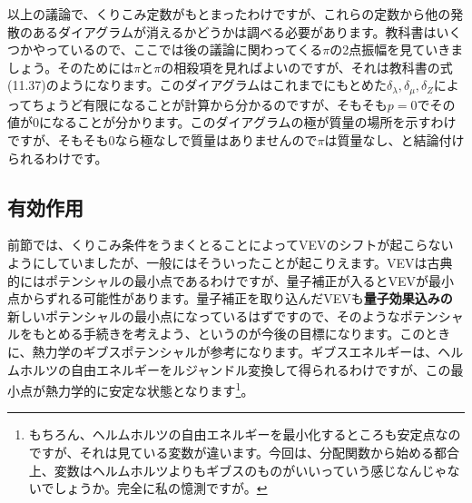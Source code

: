 \documentclass[unicode,a4paper,11pt]{ltjsarticle}
\theoremstyle{definition}
\begin{document}
以上の議論で、くりこみ定数がもとまったわけですが、これらの定数から他の発散のあるダイアグラムが消えるかどうかは調べる必要があります。教科書はいくつかやっているので、ここでは後の議論に関わってくる$\pi$の2点振幅を見ていきましょう。そのためには$\pi$と$\pi$の相殺項を見ればよいのですが、それは教科書の式(11.37)のようになります。このダイアグラムはこれまでにもとめた$\delta_{\lambda},\delta_{\mu},\delta_{Z}$によってちょうど有限になることが計算から分かるのですが、そもそも$p=0$でその値が0になることが分かります。このダイアグラムの極が質量の場所を示すわけですが、そもそも0なら極なしで質量はありませんので$\pi$は質量なし、と結論付けられるわけです。


\subsection{有効作用}

前節では、くりこみ条件をうまくとることによってVEVのシフトが起こらないようにしていましたが、一般にはそういったことが起こりえます。VEVは古典的にはポテンシャルの最小点であるわけですが、量子補正が入るとVEVが最小点からずれる可能性があります。量子補正を取り込んだVEVも\textbf{量子効果込みの}新しいポテンシャルの最小点になっているはずですので、そのようなポテンシャルをもとめる手続きを考えよう、というのが今後の目標になります。このときに、熱力学のギブスポテンシャルが参考になります。ギブスエネルギーは、ヘルムホルツの自由エネルギーをルジャンドル変換して得られるわけですが、この最小点が熱力学的に安定な状態となります\footnote{
   もちろん、ヘルムホルツの自由エネルギーを最小化するところも安定点なのですが、それは見ている変数が違います。今回は、分配関数から始める都合上、変数はヘルムホルツよりもギブスのものがいいっていう感じなんじゃないでしょうか。完全に私の憶測ですが。
}。
\end{document}
